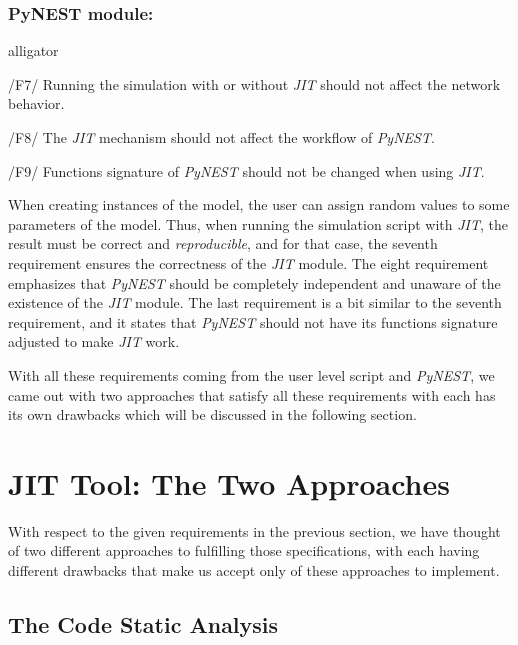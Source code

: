\subsubsection*{PyNEST module:}

\begin{labeling}{alligator}
   \item  [/F7/] Running the simulation with or without \emph{JIT} should not affect the network behavior.\\
   
     
   \item [/F8/] The \emph{JIT} mechanism should not affect the workflow of \emph{PyNEST}.\\
   
   \item  [/F9/] Functions signature of \emph{PyNEST} should not be changed when using \emph{JIT}.\\

\end{labeling}

When creating instances of the model, the user can assign random values to some parameters of the model. Thus, when running the simulation script with \emph{JIT}, the result must be correct and \emph{reproducible}, and for that  case, the seventh requirement ensures the correctness of the \emph{JIT} module. The eight requirement emphasizes that \emph{PyNEST} should be completely independent and unaware of the existence of the \emph{JIT} module. The last requirement is a bit similar to the seventh requirement, and it states that  \emph{PyNEST}  should not have its functions signature adjusted to make \emph{JIT} work.


With all these requirements coming from the user level script and \emph{PyNEST}, we came out with two approaches that satisfy all these requirements with each has its own drawbacks which will be discussed in the following section.

\section{JIT Tool: The Two Approaches}

With respect to the given requirements in the previous section, we have thought of two different approaches to fulfilling those specifications, with each having different drawbacks that make us accept only of these approaches to implement.

\subsection{The Code Static Analysis}

